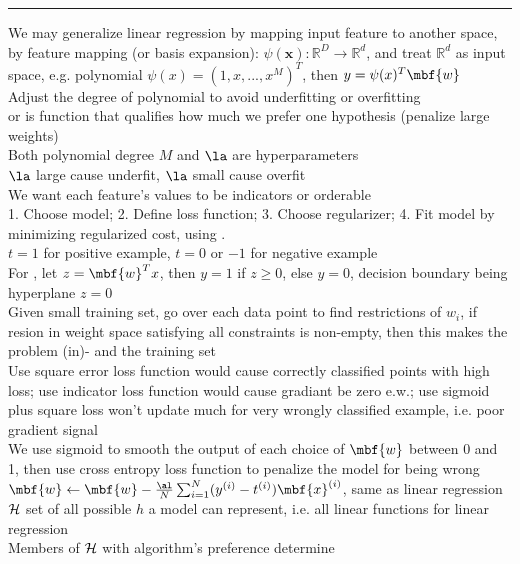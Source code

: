 \documentclass[10pt]{CheatSheet/hw}
\begin{document}
\begin{multicols*}{5}
\rule{\linewidth}{0.4pt}
We may generalize linear regression by mapping input feature to another space, by feature mapping (or basis expansion): $\psi(\mathbf{x}):\mathbb{R}^D\to\mathbb{R}^d$, and treat $\mathbb{R}^d$ as input space, e.g. polynomial $\psi(x)=(1, x, ..., x^M)^T$, then $y=\psi(x)^T\mbf{w}$\\
Adjust the degree of polynomial to avoid underfitting or overfitting\\
 or  is function that qualifies how much we prefer one hypothesis (penalize large weights)\\
Both polynomial degree $M$ and $\la$ are hyperparameters\\
$\la$ large cause underfit, $\la$ small cause overfit\\
We want each feature's values to be indicators or orderable\\
 1. Choose model; 2. Define loss function; 3. Choose regularizer; 4. Fit model by minimizing regularized cost, using .\\
$t=1$ for positive example, $t=0$ or $-1$ for negative example\\
For , let $z=\mbf{w}^Tx$, then $y=1$ if $z\ge0$, else $y=0$, decision boundary being hyperplane $z=0$\\
Given small training set, go over each data point to find restrictions of $w_i$, if resion in weight space satisfying all constraints is non-empty, then this  makes the problem (in)- and the training set \\
Use square error loss function would cause correctly classified points with high loss; use indicator loss function would cause gradiant be zero e.w.; use sigmoid plus square loss won't update much for very wrongly classified example, i.e. poor gradient signal\\
We use sigmoid to smooth the output of each choice of $\mbf{w}$ between 0 and 1, then use cross entropy loss function to penalize the model for being wrong\\
$\mbf{w}\gets \mbf{w}-\frac{\al}{N}\sum_{i=1}^N(y^{(i)}-t^{(i)})\mbf{x}^{(i)}$, same as linear regression\\
 $\cal{H}$ set of all possible $h$ a model can represent, i.e. all linear functions for linear regression\\
Members of $\cal{H}$ with algorithm's preference determine \\

\end{multicols*}
\end{document}
